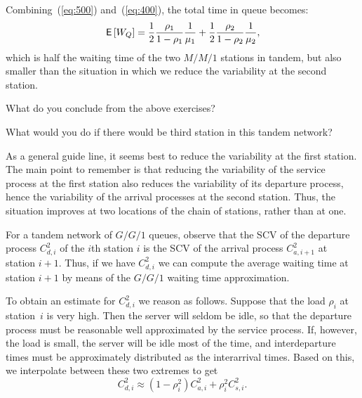 \begin{exercise}
\begin{solution}
Combining~(\ref{eq:500}) and~(\ref{eq:400}), the total  time in queue
becomes:
\begin{equation*}
  \,\mathsf{E}\left[W_Q\right]= \frac12\frac{\rho_1}{1-\rho_1} \frac1{\mu_1} +
  \frac12\frac{\rho_2}{1-\rho_2} \frac1{\mu_2}, 
\end{equation*}
which is half the waiting time of the two $M/M/1$ stations in tandem, but also smaller than the situation in which we reduce the variability at the second station.
  \end{solution}
\end{exercise}

\begin{exercise}
  What do you conclude from the above exercises?
  \begin{hint}
    What would you do if there would be third station in this tandem network?
  \end{hint}
  \begin{solution}
As a general guide line, it seems best to reduce the
variability at the first station. The main point to remember is that
reducing the variability of the service process at the first station
also reduces the variability of its departure process, hence the
variability of the arrival processes at the second station. Thus, the
situation improves at two locations of the chain of stations, rather
than at one.
  \end{solution}
\end{exercise}

For a tandem network of $G/G/1$ queues, observe that the SCV of the departure process $C_{d,i}^2$ of the $i$th station $i$ is the SCV of the arrival process $C_{a,i+1}^2$ at station $i+1$.  Thus, if we have $C_{d,i}^2$ we can compute the average waiting time at station $i+1$ by means of the $G/G/1$ waiting time approximation. 

To obtain an estimate for $C_{d,i}^2$ we reason as follows. Suppose that the load $\rho_i$ at station~$i$ is very high. Then the server will seldom be idle, so that the departure process must be reasonable well approximated by the service process. If, however, the load is small, the server will be idle most of the time, and interdeparture times must be  approximately distributed as the interarrival times. Based on this, we interpolate between these two extremes to get
\begin{equation}
  \label{eq:40}
  C_{d,i}^2 \approx (1-\rho_i^2) C_{a,i}^2 + \rho_i^2 C_{s,i}^2.
\end{equation}


